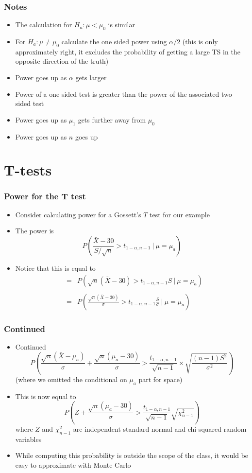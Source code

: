 \documentclass[aspectratio=169]{beamer}
\begin{document}
\begin{frame}\frametitle{Notes}
\begin{itemize}
\item The calculation for $H_a:\mu < \mu_0$ is similar
\item For $H_a: \mu \neq \mu_0$ calculate the one sided power using
  $\alpha / 2$ (this is only approximately right, it excludes the probability of
  getting a large TS in the opposite direction of the truth)
\item Power goes up as $\alpha$ gets larger
\item Power of a one sided test is greater than the power of the
  associated two sided test
\item Power goes up as $\mu_1$ gets further away from $\mu_0$
\item Power goes up as $n$ goes up
\end{itemize}
\end{frame}


\section{T-tests}
\begin{frame}\frametitle{Power for the T test}
\begin{itemize}
\item Consider calculating power for a Gossett's $T$ test for our example
\item The power is
  $$
  P\left(\frac{\bar X - 30}{S /\sqrt{n}} > t_{1-\alpha, n-1} ~|~ \mu = \mu_a \right)
  $$
\item Notice that this is equal to
  \begin{eqnarray*}
& = &     
  P\left(\sqrt{n}(\bar X - 30) > t_{1 - \alpha, n-1} S ~|~ \mu = \mu_a \right)\\ \\
& = &     
  P\left(\frac{\sqrt{n}(\bar X - 30)}{\sigma}   > t_{1-\alpha, n-1} \frac{S}{\sigma} ~|~ \mu = \mu_a \right)
  \end{eqnarray*}
\end{itemize}
\end{frame}

\begin{frame}\frametitle{Continued}
\begin{itemize}
\item Continued
$$
  P\left(\frac{\sqrt{n}(\bar X - \mu_a)}{\sigma} + \frac{\sqrt{n}(\mu_a - 30)}{\sigma} > \frac{t_{1-\alpha, n-1}}{\sqrt{n-1}}\times \sqrt{\frac{(n-1) S^2}{\sigma^2}} \right)$$
(where we omitted the conditional on $\mu_a$ part for space)
\item This is now equal to
$$
P\left(Z + \frac{\sqrt{n}(\mu_a - 30)}{\sigma} >  \frac{t_{1 - \alpha, n-1}}{\sqrt{n-1}} \sqrt{\chi^2_{n-1}}\right)
$$
where $Z$ and $\chi^2_{n-1}$ are independent standard normal and chi-squared random variables
\item While computing this probability is outside the scope of the class, it would be easy to approximate with Monte Carlo
\end{itemize}
\end{frame}
\end{document}
